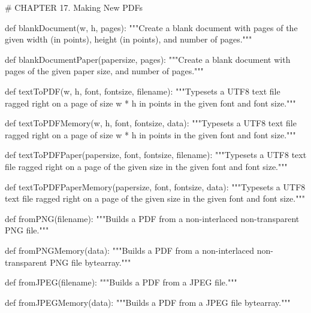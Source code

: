 # CHAPTER 17. Making New PDFs

def blankDocument(w, h, pages):
    """Create a blank document with pages of the given width (in points),
    height (in points), and number of pages."""

def blankDocumentPaper(papersize, pages):
    """Create a blank document with pages of the given paper size, and number
    of pages."""

def textToPDF(w, h, font, fontsize, filename):
    """Typesets a UTF8 text file ragged right on a page of size w * h in points
    in the given font and font size."""

def textToPDFMemory(w, h, font, fontsize, data):
    """Typesets a UTF8 text file ragged right on a page of size w * h in points
    in the given font and font size."""

def textToPDFPaper(papersize, font, fontsize, filename):
    """Typesets a UTF8 text file ragged right on a page of the given size in
    the given font and font size."""

def textToPDFPaperMemory(papersize, font, fontsize, data):
    """Typesets a UTF8 text file ragged right on a page of the given size in
    the given font and font size."""

def fromPNG(filename):
    """Builds a PDF from a non-interlaced non-transparent PNG file."""

def fromPNGMemory(data):
    """Builds a PDF from a non-interlaced non-transparent PNG file bytearray."""

def fromJPEG(filename):
    """Builds a PDF from a JPEG file."""

def fromJPEGMemory(data):
    """Builds a PDF from a JPEG file bytearray."""
